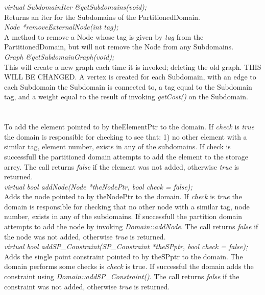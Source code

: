 {\em virtual SubdomainIter \&getSubdomains(void);} \\
Returns an iter for the Subdomains of the PartitionedDomain. \\


{\em Node *removeExternalNode(int tag); } \\
A method to remove a Node whose tag is given by {\em tag} from the PartitionedDomain, 
but will not remove the Node from any Subdomains. \\

{\em Graph \&getSubdomainGraph(void); } \\
This will create a new graph each time it is invoked; deleting the old graph. THIS WILL
BE CHANGED.  A vertex is created for each Subdomain, with an edge to each Subdomain the 
Subdomain is connected to, a tag equal to the Subdomain tag,  and a weight equal to the 
result of invoking {\em getCost()} on the Subdomain. \\

\\
  \\
To add the element pointed to by theElementPtr to the domain. If {\em check}
is {\em true} the domain is responsible for checking to see that: 1)
no other element with a similar tag, element number, exists in any of
the subdomains. If check is successfull the partitioned domain
attempts to add the element to the storage arrey. The call returns
{\em false} if the element was not added, otherwise {\em true} is 
returned.\\   

{\em virtual bool addNode(Node *theNodePtr, bool check = false);}  \\
Adds the node pointed to by theNodePtr to the domain. If {\em check}
is {\em true} the domain is responsible for checking that no other
node with a similar tag, node number, exists in any of the
subdomains. If successfull the partition domain attempts to add the
node by invoking {\em Domain::addNode}. The call returns {\em false} if
the node was not added, otherwise {\em true} is returned. \\  


{\em virtual bool addSP\_Constraint(SP\_Constraint *theSPptr, bool
check = false);}  \\
Adds the single point constraint pointed to by theSPptr to the 
domain. The domain performs some checks is {\em check} is true. If
successful the domain adds the constraint using {\em
Domain::addSP\_Constraint()}. The call returns {\em false} if
the constraint was not added, otherwise {\em true} is returned. \\  

